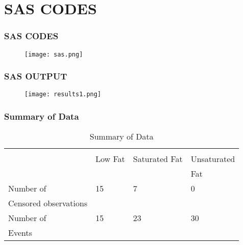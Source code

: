 \documentclass[hyperref={pdfpagelabels=false}]{beamer}
\begin{document}
\section{SAS CODES} 

\begin{frame}
\frametitle{SAS CODES}
\begin{figure}[h!]
  \centering
    \texttt{[image: sas.png]}
\end{figure} 
\end{frame}
\begin{frame}
\frametitle{SAS OUTPUT}
\begin{figure}[h!]
  \centering
    \texttt{[image: results1.png]}
\end{figure}

\end{frame}









\begin{frame}
\frametitle{Summary of Data}
\begin{table}[h]
\centering
\begin{tabular}{ |l|l|l|l| }
\multicolumn{3}{c}{} \\
\cline{1-4}
  & Low Fat  & Saturated Fat&Unsaturated \\
&  & &Fat\\
\hline
Number of &    15  & 7   & 0     \\
  Censored observations &  &   &\\
               \hline
    Number of &  15    & 23  & 30     \\
  Events & &  &\\
               \hline

\end{tabular}
\caption{Summary of Data }
\end{table}
\end{frame}
\end{document}
